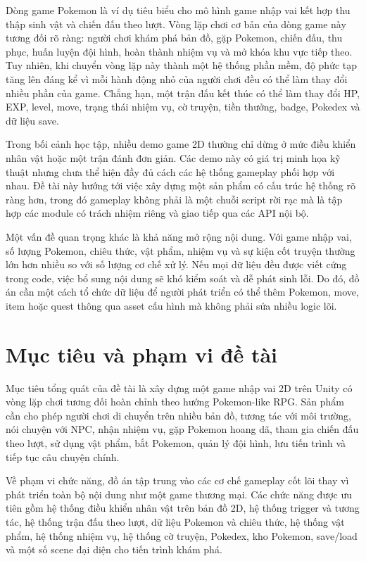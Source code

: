 Dòng game Pokemon là ví dụ tiêu biểu cho mô hình game nhập vai kết hợp thu thập sinh vật và chiến đấu theo lượt. Vòng lặp chơi cơ bản của dòng game này tương đối rõ ràng: người chơi khám phá bản đồ, gặp Pokemon, chiến đấu, thu phục, huấn luyện đội hình, hoàn thành nhiệm vụ và mở khóa khu vực tiếp theo. Tuy nhiên, khi chuyển vòng lặp này thành một hệ thống phần mềm, độ phức tạp tăng lên đáng kể vì mỗi hành động nhỏ của người chơi đều có thể làm thay đổi nhiều phần của game. Chẳng hạn, một trận đấu kết thúc có thể làm thay đổi HP, EXP, level, move, trạng thái nhiệm vụ, cờ truyện, tiền thưởng, badge, Pokedex và dữ liệu save.

Trong bối cảnh học tập, nhiều demo game 2D thường chỉ dừng ở mức điều khiển nhân vật hoặc một trận đánh đơn giản. Các demo này có giá trị minh họa kỹ thuật nhưng chưa thể hiện đầy đủ cách các hệ thống gameplay phối hợp với nhau. Đề tài này hướng tới việc xây dựng một sản phẩm có cấu trúc hệ thống rõ ràng hơn, trong đó gameplay không phải là một chuỗi script rời rạc mà là tập hợp các module có trách nhiệm riêng và giao tiếp qua các API nội bộ.

Một vấn đề quan trọng khác là khả năng mở rộng nội dung. Với game nhập vai, số lượng Pokemon, chiêu thức, vật phẩm, nhiệm vụ và sự kiện cốt truyện thường lớn hơn nhiều so với số lượng cơ chế xử lý. Nếu mọi dữ liệu đều được viết cứng trong code, việc bổ sung nội dung sẽ khó kiểm soát và dễ phát sinh lỗi. Do đó, đồ án cần một cách tổ chức dữ liệu để người phát triển có thể thêm Pokemon, move, item hoặc quest thông qua asset cấu hình mà không phải sửa nhiều logic lõi.

\section{Mục tiêu và phạm vi đề tài}

Mục tiêu tổng quát của đề tài là xây dựng một game nhập vai 2D trên Unity có vòng lặp chơi tương đối hoàn chỉnh theo hướng Pokemon-like RPG. Sản phẩm cần cho phép người chơi di chuyển trên nhiều bản đồ, tương tác với môi trường, nói chuyện với NPC, nhận nhiệm vụ, gặp Pokemon hoang dã, tham gia chiến đấu theo lượt, sử dụng vật phẩm, bắt Pokemon, quản lý đội hình, lưu tiến trình và tiếp tục câu chuyện chính.

Về phạm vi chức năng, đồ án tập trung vào các cơ chế gameplay cốt lõi thay vì phát triển toàn bộ nội dung như một game thương mại. Các chức năng được ưu tiên gồm hệ thống điều khiển nhân vật trên bản đồ 2D, hệ thống trigger và tương tác, hệ thống trận đấu theo lượt, dữ liệu Pokemon và chiêu thức, hệ thống vật phẩm, hệ thống nhiệm vụ, hệ thống cờ truyện, Pokedex, kho Pokemon, save/load và một số scene đại diện cho tiến trình khám phá.

